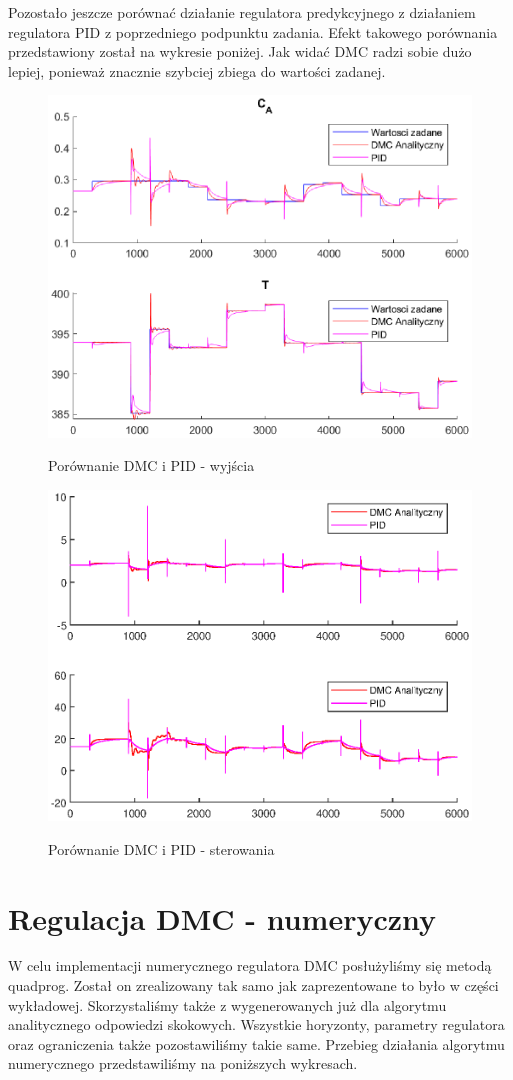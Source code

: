 \newpage
Pozostało jeszcze porównać działanie regulatora predykcyjnego z działaniem regulatora PID z poprzedniego podpunktu zadania. Efekt takowego porównania przedstawiony został na wykresie poniżej. Jak widać DMC radzi sobie dużo lepiej, ponieważ znacznie szybciej zbiega do wartości zadanej.
\begin{figure}[h!]
	\centering
	\includegraphics[width=.7\linewidth]{img/dmcvspid.eps}
	\label{ch2:dmcvspid}
	\caption{Porównanie DMC i PID - wyjścia}
\end{figure}
\begin{figure}[h!]
\centering
\includegraphics[width=.7\linewidth]{img/dmcvspidster}
\label{ch2:dmcvspidster}
\caption{Porównanie DMC i PID - sterowania}
\end{figure}

\section{Regulacja DMC - numeryczny}
W celu implementacji numerycznego regulatora DMC posłużyliśmy się metodą quadprog. Został on zrealizowany tak samo jak zaprezentowane to było w części wykładowej. Skorzystaliśmy także z wygenerowanych już dla algorytmu analitycznego odpowiedzi skokowych. Wszystkie horyzonty, parametry regulatora oraz ograniczenia także pozostawiliśmy takie same. Przebieg działania algorytmu numerycznego przedstawiliśmy na poniższych wykresach.

